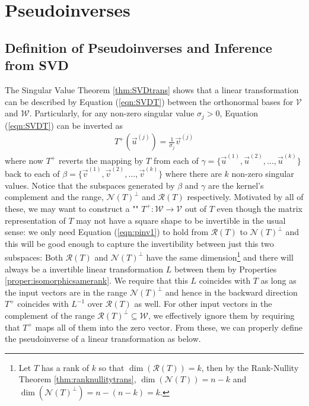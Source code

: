 \section{Pseudoinverses}

\subsection{Definition of Pseudoinverses and Inference from SVD}

The Singular Value Theorem \ref{thm:SVDtrans} shows that a linear transformation can be described by Equation (\ref{eqn:SVDT}) between the orthonormal bases for $\mathcal{V}$ and $\mathcal{W}$. Particularly, for any non-zero singular value $\sigma_j > 0$, Equation (\ref{eqn:SVDT}) can be inverted as
\begin{align}
T^+(\vec{u}^{(j)}) = \frac{1}{\sigma_j} \vec{v}^{(j)} \label{eqn:pinv1}
\end{align}
where now $T^+$ reverts the mapping by $T$ from each of $\gamma = \{\vec{u}^{(1)}, \vec{u}^{(2)},\ldots,\vec{u}^{(k)}\}$ back to each of $\beta = \{\vec{v}^{(1)}, \vec{v}^{(2)},\ldots,\vec{v}^{(k)}\}$ where there are $k$ non-zero singular values. Notice that the subspaces generated by $\beta$ and $\gamma$ are the kernel's complement and the range, $\mathcal{N}(T)^\perp$ and $\mathcal{R}(T)$ respectively. Motivated by all of these, we may want to construct a "" $T^+: \mathcal{W} \to \mathcal{V}$ out of $T$ even though the matrix representation of $T$ may not have a square shape to be invertible in the usual sense: we only need Equation (\ref{eqn:pinv1}) to hold from $\mathcal{R}(T)$ to $\mathcal{N}(T)^\perp$ and this will be good enough to capture the invertibility between just this two subspaces: Both $\mathcal{R}(T)$ and $\mathcal{N}(T)^\perp$ have the same dimension\footnote{Let $T$ has a rank of $k$ so that $\dim(\mathcal{R}(T)) = k$, then by the Rank-Nullity Theorem \ref{thm:ranknullitytrans}, $\dim(\mathcal{N}(T)) = n-k$ and $\dim(\mathcal{N}(T)^\perp) = n-(n-k) = k$.} and there will always be a invertible linear transformation $L$ between them by Properties \ref{proper:isomorphicsamerank}. We require that this $L$ coincides with $T$ as long as the input vectors are in the range $\mathcal{N}(T)^\perp$ and hence in the backward direction $T^+$ coincides with $L^{-1}$ over $\mathcal{R}(T)$ as well. For other input vectors in the complement of the range $\mathcal{R}(T)^\perp \subseteq \mathcal{W}$, we effectively ignore them by requiring that $T^+$ maps all of them into the zero vector. From these, we can properly define the pseudoinverse of a linear transformation as below.
